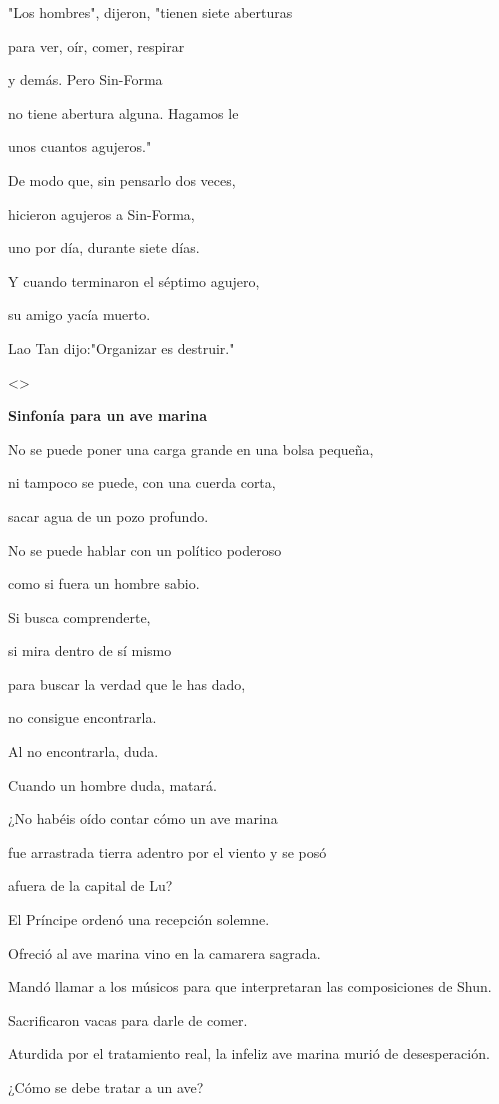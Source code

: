 "Los hombres", dijeron, "tienen siete aberturas

para ver, oír, comer, respirar

y demás. Pero Sin-Forma

no tiene abertura alguna. Hagamos le

unos cuantos agujeros."

De modo que, sin pensarlo dos veces,

hicieron agujeros a Sin-Forma,

uno por día, durante siete días.

Y cuando terminaron el séptimo agujero,

su amigo yacía muerto.

Lao Tan dijo:"Organizar es destruir."

\textless\textgreater{}

\textbf{{Sinfonía para un ave marina}}

No se puede poner una carga grande en una bolsa pequeña,

ni tampoco se puede, con una cuerda corta,

sacar agua de un pozo profundo.

No se puede hablar con un político poderoso

como si fuera un hombre sabio.

Si busca comprenderte,

si mira dentro de sí mismo

para buscar la verdad que le has dado,

no consigue encontrarla.

Al no encontrarla, duda.

Cuando un hombre duda, matará.

¿No habéis oído contar cómo un ave marina

fue arrastrada tierra adentro por el viento y se posó

afuera de la capital de Lu?

El Príncipe ordenó una recepción solemne.

Ofreció al ave marina vino en la camarera sagrada.

Mandó llamar a los músicos para que interpretaran las composiciones de
Shun.

Sacrificaron vacas para darle de comer.

Aturdida por el tratamiento real, la infeliz ave marina murió de
desesperación.

¿Cómo se debe tratar a un ave?

